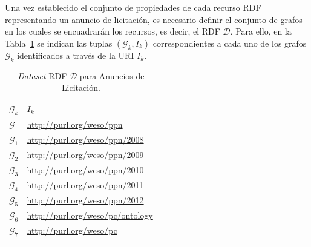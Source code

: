 % 
Una vez establecido el conjunto de propiedades de cada recurso \gls{RDF} representando un 
anuncio de licitación, es necesario definir el conjunto de grafos en los cuales se encuadrarán 
los recursos, es decir, el \dataset RDF $\mathcal{D}$. Para ello, 
en la Tabla~\ref{table:ppn-dataset} se indican las tuplas $(\mathcal{G}_k, I_k)$ correspondientes a cada uno 
de los grafos $\mathcal{G}_k$ identificados a través de la URI $I_k$.
% 
\begin{longtable}[c]{|p{3cm}|p{9cm}|} 
\hline
  \textbf{$\mathcal{G}_k$} &  \textbf{$I_k$}  \\\hline
\endhead
 \textbf{$\mathcal{G}$}   & \url{http://purl.org/weso/ppn} \\ \hline
 \textbf{$\mathcal{G}_1$} & \url{http://purl.org/weso/ppn/2008} \\ \hline
 \textbf{$\mathcal{G}_2$} & \url{http://purl.org/weso/ppn/2009} \\ \hline
 \textbf{$\mathcal{G}_3$} & \url{http://purl.org/weso/ppn/2010} \\ \hline
 \textbf{$\mathcal{G}_4$} & \url{http://purl.org/weso/ppn/2011} \\ \hline
 \textbf{$\mathcal{G}_5$} & \url{http://purl.org/weso/ppn/2012} \\ \hline
 \textbf{$\mathcal{G}_{6}$} & \url{http://purl.org/weso/pc/ontology} \\ \hline 
 \textbf{$\mathcal{G}_{7}$} & \url{http://purl.org/weso/pc} \\ \hline 
\hline
\caption{\textit{Dataset} RDF $\mathcal{D}$ para Anuncios de Licitación.}\label{table:ppn-dataset}\\    
\end{longtable}
% 
% 
